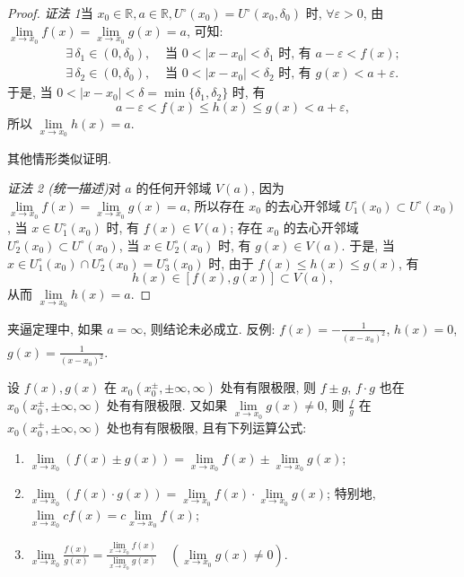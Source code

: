 \begin{proof}
\textit{证法 1}\quad 当 $x_{0}\in\mathbb{R}, a\in\mathbb{R}, U^{\circ}(x_{0})=U^{\circ}(x_{0},\delta_{0})$ 时, $\forall\varepsilon>0$, 由 $\lim\limits_{x\to x_{0}}f(x)=\lim\limits_{x\to x_{0}}g(x)=a$, 可知:
\begin{align*}
\exists\,\delta_1 \in (0, \delta_0),&\text{ 当 } 0 < |x - x_0| < \delta_1 \text{ 时, 有 } a - \varepsilon < f(x); \\
\exists\,\delta_{2}\in(0,\delta_{0}),&\text{ 当 } 0<|x-x_{0}|<\delta_{2} \text{ 时, 有 } g(x)<a+\varepsilon.
\end{align*}
于是, 当 $0<|x-x_0|<\delta=\min\{\delta_1,\delta_2\}$ 时, 有
\[
a-\varepsilon<f(x)\leqslant h(x)\leqslant g(x)<a+\varepsilon,
\]
所以 $\lim\limits_{x\to x_0}h(x)=a$.

其他情形类似证明.

\textit{证法 2 (统一描述)}\quad 对 $a$ 的任何开邻域 $V(a)$, 因为 $\lim\limits_{x\to x_0}f(x)=\lim\limits_{x\to x_0}g(x)=a$, 所以存在 $x_0$ 的去心开邻域 $U_1^\circ(x_0)\subset U^\circ(x_0)$, 当 $x\in U_1^\circ(x_0)$ 时, 有 $f(x)\in V(a)$; 存在 $x_0$ 的去心开邻域 $U_2^\circ(x_0)\subset U^\circ(x_0)$, 当 $x\in U_2^\circ(x_0)$ 时, 有 $g(x)\in V(a)$. 于是, 当 $x\in U_1^\circ(x_0)\cap U_2^\circ(x_0)=U_3^\circ(x_0)$ 时, 由于 $f(x)\leqslant h(x)\leqslant g(x)$, 有
\[
h(x)\in[f(x),g(x)]\subset V(a),
\]
从而 $\lim\limits_{x\to x_{0}}h(x)=a$.
\end{proof}

\begin{remark}\label{rem:2.2.1}
夹逼定理中, 如果 $a=\infty$, 则结论未必成立. 反例: $f(x)=-\frac{1}{(x-x_{0})^{2}}$, $h(x)=0$, $g(x)=\frac{1}{(x-x_{0})^{2}}$.
\end{remark}

\begin{theorem}[极限的四则运算法则]\label{thm:2.2.6}
设 $f(x), g(x)$ 在 $x_{0}(x_{0}^{\pm}, \pm\infty, \infty)$ 处有有限极限, 则 $f \pm g$, $f \cdot g$ 也在 $x_{0}(x_{0}^{\pm}, \pm\infty, \infty)$ 处有有限极限. 又如果 $\lim\limits_{x \to x_{0}} g(x) \neq 0$, 则 $\frac{f}{g}$ 在 $x_{0}(x_{0}^{\pm}, \pm\infty, \infty)$ 处也有有限极限, 且有下列运算公式:
\begin{enumerate}[label=(\arabic*)]
  \item $\lim\limits_{x \to x_0} (f(x) \pm g(x)) = \lim\limits_{x \to x_0} f(x) \pm \lim\limits_{x \to x_0} g(x)$;
  \item $\lim\limits_{x \to x_0} (f(x) \cdot g(x)) = \lim\limits_{x \to x_0} f(x) \cdot \lim\limits_{x \to x_0} g(x)$; 特别地, $\lim\limits_{x \to x_0} c f(x) = c \lim\limits_{x \to x_0} f(x)$;
  \item $\lim\limits_{x \to x_0} \frac{f(x)}{g(x)} = \frac{\lim\limits_{x \to x_0} f(x)}{\lim\limits_{x \to x_0} g(x)} \quad \left(\lim\limits_{x \to x_0} g(x) \neq 0\right)$.
\end{enumerate}
\end{theorem}

